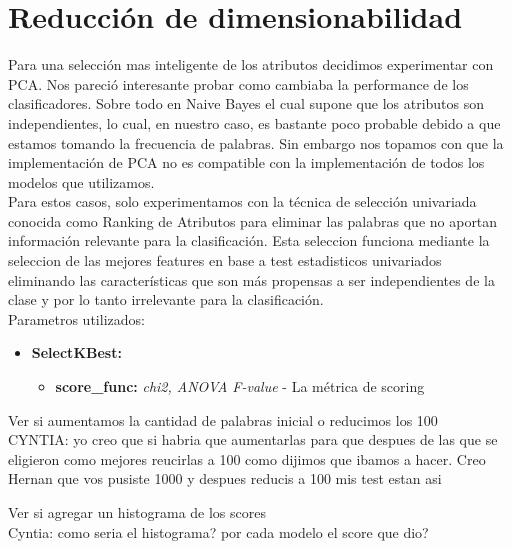 \section{Reducción de dimensionabilidad}

Para una selección mas inteligente de los atributos decidimos experimentar con PCA. Nos pareció interesante probar como cambiaba la performance de los clasificadores. Sobre todo en Naive Bayes el cual supone que los atributos son independientes, lo cual, en nuestro caso, es bastante poco probable debido a que estamos tomando la frecuencia de palabras. Sin embargo nos topamos con que la implementación de PCA no es compatible con la implementación de todos los modelos que utilizamos. \\


Para estos casos, solo experimentamos con la técnica de selección univariada conocida como Ranking de Atributos para eliminar las palabras que no aportan información relevante para la clasificación. Esta seleccion funciona mediante la seleccion de las mejores features en base a test estadisticos univariados eliminando las características que son más propensas a ser independientes de la clase y por lo tanto irrelevante para la clasificación.\\
  
Parametros utilizados:

\begin{itemize}
\item \textbf{SelectKBest:} 
	\begin{itemize}
	\item \textbf{score\_func:} \textit{chi2, ANOVA F-value} - La métrica de scoring
	\end{itemize}
\end{itemize}



{\Large Ver si aumentamos la cantidad de palabras inicial o reducimos los 100\\
CYNTIA: yo creo que si habria que aumentarlas para que despues de las que se eligieron como mejores reucirlas a 100 como dijimos que ibamos a hacer. Creo Hernan que vos pusiste 1000 y despues reducis a 100 mis test estan asi
}

{\Large Ver si agregar un histograma de los scores\\
Cyntia: como seria el histograma? por cada modelo el score que dio? 
}

